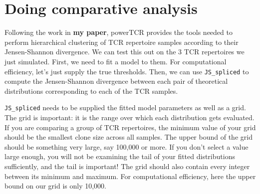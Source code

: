 \documentclass[]{article}
\theoremstyle{definition}
\theoremstyle{definition}
\theoremstyle{definition}
\theoremstyle{remark}
\begin{document}
\section{Doing comparative analysis}\label{doing-comparative-analysis}

Following the work in \textbf{my paper}, powerTCR provides the tools
needed to perform hierarchical clustering of TCR repertoire samples
according to their Jensen-Shannon divergence. We can test this out on
the 3 TCR repertoires we just simulated. First, we need to fit a model
to them. For computational efficiency, let's just supply the true
thresholds. Then, we can use \texttt{JS_spliced} to compute the
Jensen-Shannon divergence between each pair of theoretical distributions
corresponding to each of the TCR samples.

\texttt{JS_spliced} needs to be supplied the fitted model parameters as
well as a grid. The grid is important: it is the range over which each
distribution gets evaluated. If you are comparing a group of TCR
repertoires, the minimum value of your grid should be the smallest clone
size across all samples. The upper bound of the grid should be something
very large, say 100,000 or more. If you don't select a value large
enough, you will not be examining the tail of your fitted distributions
sufficiently, and the tail is important! The grid should also contain
every integer between its minimum and maximum. For computational
efficiency, here the upper bound on our grid is only 10,000.
\end{document}
